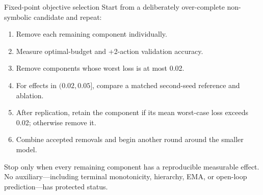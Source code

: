 \documentclass[aspectratio=169,10pt]{beamer}
\begin{document}
\begin{frame}{Fixed-point objective selection}
\small
Start from a deliberately over-complete non-symbolic candidate and repeat:
\begin{enumerate}
\item Remove each remaining component individually.
\item Measure optimal-budget and +2-action validation accuracy.
\item Remove components whose worst loss is at most 0.02.
\item For effects in $(0.02,0.05]$, compare a matched second-seed reference
and ablation.
\item After replication, retain the component if its mean worst-case loss
exceeds 0.02; otherwise remove it.
\item Combine accepted removals and begin another round around the smaller
model.
\end{enumerate}

Stop only when every remaining component has a reproducible measurable effect.
No auxiliary---including terminal monotonicity, hierarchy, EMA, or
open-loop prediction---has protected status.
\end{frame}
\end{document}
